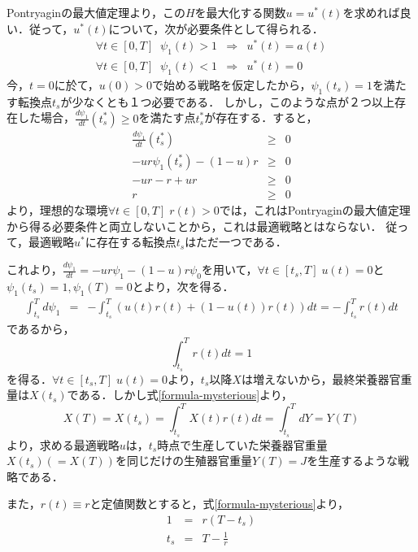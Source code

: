 \documentclass[uplatex,dvipdfmx]{jsreport}
\begin{document}
\begin{example}
    Pontryaginの最大値定理より，この$H$を最大化する関数$u=u^*(t)$を求めれば良い．従って，$u^*(t)$について，次が必要条件として得られる．
    \begin{eqnarray}
        \forall t\in [0,T]\;\; \psi_1(t)>1 &\Rightarrow& u^*(t)=a(t) \\
        \forall t\in [0,T]\;\; \psi_1(t)<1 &\Rightarrow& u^*(t)=0
    \end{eqnarray}
    今，$t=0$に於て，$u(0)>0$で始める戦略を仮定したから，$\psi_1(t_s)=1$を満たす転換点$t_s$が少なくとも１つ必要である．
    しかし，このような点が２つ以上存在した場合，$\frac{d\psi_1}{dt}(t^*_s)\ge 0$を満たす点$t^*_s$が存在する．すると，
    \begin{eqnarray*}
        \frac{d\psi_1}{dt}(t^*_s) &\ge& 0 \\
        -ur\psi_1(t^*_s)-(1-u)r &\ge& 0 \\
        -ur-r+ur&\ge&0\\
        r&\ge&0
    \end{eqnarray*}
    より，理想的な環境$\forall t\in [0,T]\; r(t)>0$では，これはPontryaginの最大値定理から得る必要条件と両立しないことから，これは最適戦略とはならない．
    従って，最適戦略$u^*$に存在する転換点$t_s$はただ一つである．

    これより，$\frac{d\psi_1}{dt}=-ur\psi_1-(1-u)r\psi_0$を用いて，$\forall t\in [t_s,T]\; u(t)=0$と$\psi_1(t_s)=1,\psi_1(T)=0$とより，次を得る．
    \begin{eqnarray*}
        \int^T_{t_s}d\psi_1 &=& -\int^T_{t_s}(u(t)r(t)+(1-u(t))r(t))dt = -\int^T_{t_s}r(t)dt
    \end{eqnarray*}
    であるから，
    \begin{equation}\label{formula-mysterious}
        \int^T_{t_s}r(t)dt = 1
    \end{equation}
    を得る．$\forall t\in [t_s,T]\; u(t)=0$より，$t_s$以降$X$は増えないから，最終栄養器官重量は$X(t_s)$である．しかし式\ref{formula-mysterious}より，
    \begin{equation}
        X(T) = X(t_s) = \int^T_{t_s}X(t)r(t)dt = \int^T_{t_s}dY = Y(T)
    \end{equation}
    より，求める最適戦略$u$は，$t_s$時点で生産していた栄養器官重量$X(t_s)(=X(T))$を同じだけの生殖器官重量$Y(T)=J$を生産するような戦略である．

    また，$r(t)\equiv r$と定値関数とすると，式\ref{formula-mysterious}より，
    \begin{eqnarray*}
        1 &=& r(T-t_s) \\
        t_s &=& T-\frac{1}{r}
    \end{eqnarray*}
\end{example}
\end{document}
